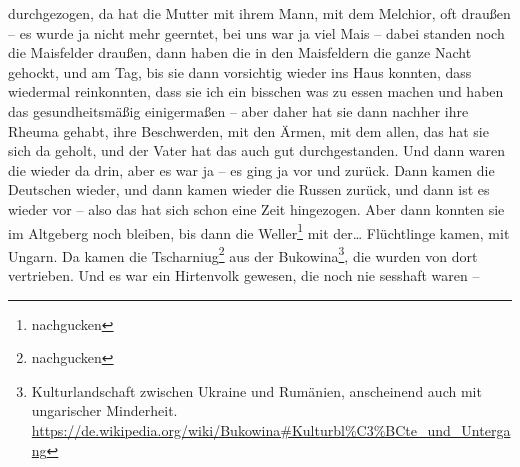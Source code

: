 \documentclass[ngerman,]{article}
\begin{document}
\begin{multicols}{2}
\begin{description}
durchgezogen, da hat die Mutter mit ihrem Mann, mit dem Melchior, oft
draußen – es wurde ja nicht mehr geerntet, bei uns war ja viel Mais –
dabei standen noch die Maisfelder draußen, dann haben die in den
Maisfeldern die ganze Nacht gehockt, und am Tag, bis sie dann vorsichtig
wieder ins Haus konnten, dass wiedermal reinkonnten, dass sie ich ein
bisschen was zu essen machen und haben das gesundheitsmäßig einigermaßen
– aber daher hat sie dann nachher ihre Rheuma gehabt, ihre Beschwerden,
mit den Ärmen, mit dem allen, das hat sie sich da geholt, und der Vater
hat das auch gut durchgestanden. Und dann waren die wieder da drin, aber
es war ja – es ging ja vor und zurück. Dann kamen die Deutschen wieder,
und dann kamen wieder die Russen zurück, und dann ist es wieder vor –
also das hat sich schon eine Zeit hingezogen. Aber dann konnten sie im
Altgeberg noch bleiben, bis dann die Weller\footnote{nachgucken} mit
der\ldots{} Flüchtlinge kamen, mit Ungarn. Da kamen die
Tscharniug\footnote{nachgucken} aus der Bukowina\footnote{Kulturlandschaft
  zwischen Ukraine und Rumänien, anscheinend auch mit ungarischer
  Minderheit.
  \url{https://de.wikipedia.org/wiki/Bukowina\#Kulturbl\%C3\%BCte_und_Untergang}},
die wurden von dort vertrieben. Und es war ein Hirtenvolk gewesen, die
noch nie sesshaft waren –
\end{description}


\end{multicols}
\end{document}
